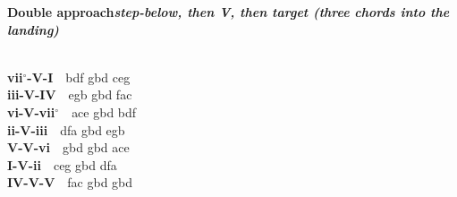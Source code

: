 \documentclass[letterpaper,12pt]{article}
\begin{document}
\begin{multicols}{4}
\noindent\colorbox{hdr5}{\begin{minipage}{\dimexpr\linewidth-2\fboxsep\relax}\raggedright\color{white}\bfseries Double approach\quad\normalfont\itshape step-below, then V, then target (three chords into the landing)\end{minipage}}\\[0.1mm]
\noindent\hangindent=0.25in {\color{lhcol}\bfseries vii$^\circ$-V-I}~~{\ttfamily bdf  gbd  ceg}\\[0.1mm]
\noindent\hangindent=0.25in {\color{lhcol}\bfseries iii-V-IV}~~{\ttfamily egb  gbd  fac}\\[0.1mm]
\noindent\hangindent=0.25in {\color{lhcol}\bfseries vi-V-vii$^\circ$}~~{\ttfamily ace  gbd  bdf}\\[0.1mm]
\noindent\hangindent=0.25in {\color{lhcol}\bfseries ii-V-iii}~~{\ttfamily dfa  gbd  egb}\\[0.1mm]
\noindent\hangindent=0.25in {\color{lhcol}\bfseries V-V-vi}~~{\ttfamily gbd  gbd  ace}\\[0.1mm]
\noindent\hangindent=0.25in {\color{lhcol}\bfseries I-V-ii}~~{\ttfamily ceg  gbd  dfa}\\[0.1mm]
\noindent\hangindent=0.25in {\color{lhcol}\bfseries IV-V-V}~~{\ttfamily fac  gbd  gbd}\\[0.1mm]
\vspace{1.5mm}


\end{multicols}
\end{document}
